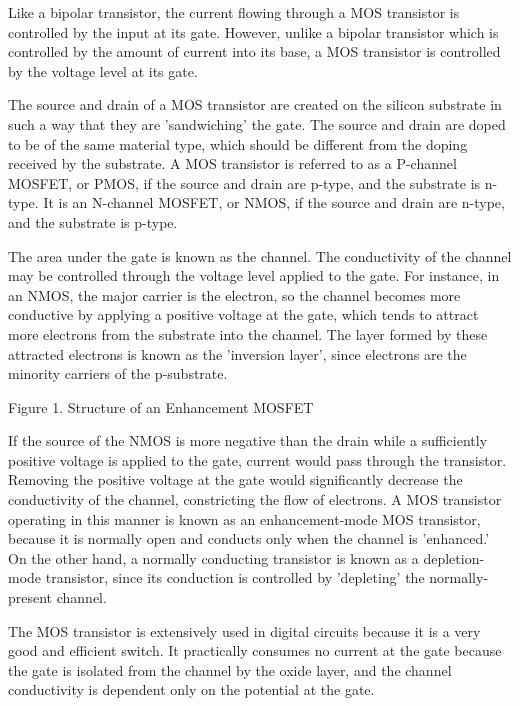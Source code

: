Like a bipolar transistor, the current flowing through a MOS transistor is controlled by the input at its gate.  However, unlike a bipolar transistor which is controlled by the amount of current into its base, a MOS transistor is controlled by the voltage level at its gate.



The source and drain of a MOS transistor are created on the silicon substrate in such a way that they are 'sandwiching' the gate.  The source and drain are doped to be of the same material type, which should be different from the doping received by the substrate.  A MOS transistor is referred to as a P-channel MOSFET, or PMOS, if the source and drain are p-type, and the substrate is n-type.   It is an N-channel MOSFET, or NMOS, if the source and drain are n-type, and the substrate is p-type.



The area under the gate is known as the channel.  The conductivity of the channel may be controlled through the voltage level applied to the gate.   For instance, in an NMOS, the major carrier is the electron, so the channel becomes more conductive by applying a positive voltage at the gate, which tends to attract more electrons from the substrate into the channel.  The layer formed by these attracted electrons is known as the 'inversion layer', since electrons are the minority carriers of the p-substrate.





Figure 1. Structure of an Enhancement MOSFET




If the source of the NMOS is more negative than the drain while a sufficiently positive voltage is applied to the gate, current would pass through the transistor.  Removing the positive voltage at the gate would significantly decrease the conductivity of the channel, constricting the flow of electrons.  A MOS transistor operating in this manner is known as an enhancement-mode MOS transistor, because it is normally open and conducts only when the channel is 'enhanced.'  On the other hand, a normally conducting transistor is known as a depletion-mode transistor, since its conduction is controlled by 'depleting' the normally-present channel.



The MOS transistor is extensively used in digital circuits because it is a very good and efficient switch.  It practically consumes no current at the gate because the gate is isolated from the channel by the oxide layer, and the channel conductivity is dependent only on the potential at the gate.











